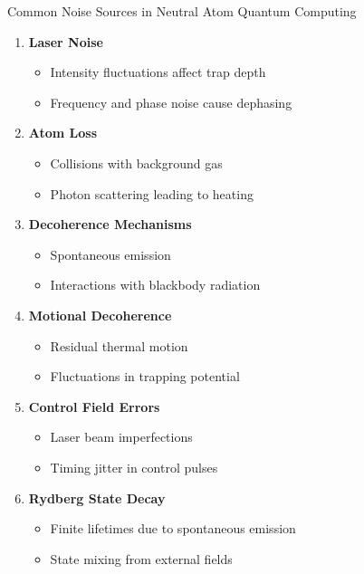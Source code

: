 \documentclass{beamer}
\begin{document}
\begin{frame}{Common Noise Sources in Neutral Atom Quantum Computing}
    \begin{enumerate}
        \item \textbf{Laser Noise}
        \begin{itemize}
            \item Intensity fluctuations affect trap depth
            \item Frequency and phase noise cause dephasing
        \end{itemize}
        \item \textbf{Atom Loss}
        \begin{itemize}
            \item Collisions with background gas
            \item Photon scattering leading to heating
        \end{itemize}
        \item \textbf{Decoherence Mechanisms}
        \begin{itemize}
            \item Spontaneous emission
            \item Interactions with blackbody radiation
        \end{itemize}
        \item \textbf{Motional Decoherence}
        \begin{itemize}
            \item Residual thermal motion
            \item Fluctuations in trapping potential
        \end{itemize}
        \item \textbf{Control Field Errors}
        \begin{itemize}
            \item Laser beam imperfections
            \item Timing jitter in control pulses
        \end{itemize}
        \item \textbf{Rydberg State Decay}
        \begin{itemize}
            \item Finite lifetimes due to spontaneous emission
            \item State mixing from external fields
        \end{itemize}
    \end{enumerate}
\end{frame}
\end{document}
